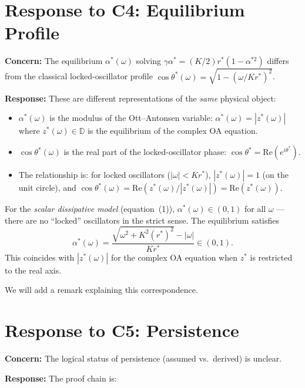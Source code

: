 \documentclass[11pt]{article}
\newcommand{\D}{\mathbb{D}}
\theoremstyle{plain}
\begin{document}
\section*{Response to C4: Equilibrium Profile}

\textbf{Concern:} The equilibrium $\alpha^*(\omega)$ solving $\gamma\alpha^* = (K/2)r^*(1 - \alpha^{*2})$ differs from the classical locked-oscillator profile $\cos\theta^*(\omega) = \sqrt{1 - (\omega/Kr^*)^2}$.

\textbf{Response:} These are different representations of the \emph{same} physical object:

\begin{itemize}
\item $\alpha^*(\omega)$ is the modulus of the Ott--Antonsen variable: $\alpha^*(\omega) = |z^*(\omega)|$ where $z^*(\omega) \in \D$ is the equilibrium of the complex OA equation.
\item $\cos\theta^*(\omega)$ is the real part of the locked-oscillator phase: $\cos\theta^* = \mathrm{Re}(e^{i\theta^*})$.
\item The relationship is: for locked oscillators ($|\omega| < Kr^*$), $|z^*(\omega)| = 1$ (on the unit circle), and $\cos\theta^*(\omega) = \mathrm{Re}(z^*(\omega)/|z^*(\omega)|) = \mathrm{Re}(z^*(\omega))$.
\end{itemize}

For the \emph{scalar dissipative model} (equation~(1)), $\alpha^*(\omega) \in (0,1)$ for all $\omega$ --- there are no ``locked'' oscillators in the strict sense. The equilibrium satisfies
\[
    \alpha^*(\omega) = \frac{\sqrt{\omega^2 + K^2(r^*)^2} - |\omega|}{Kr^*} \in (0,1).
\]
This coincides with $|z^*(\omega)|$ for the complex OA equation when $z^*$ is restricted to the real axis.

We will add a remark explaining this correspondence.

\section*{Response to C5: Persistence}

\textbf{Concern:} The logical status of persistence (assumed vs.\ derived) is unclear.

\textbf{Response:} The proof chain is:
\end{document}
